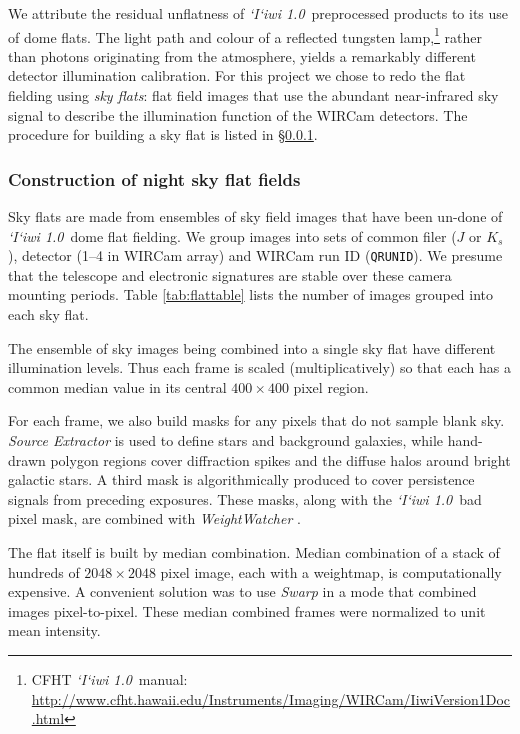 \documentclass[iop]{emulateapj}
\newcommand{\sw}[1]{\textit{#1}} %
\newcommand{\iiwione}{\sw{`I`iwi 1.0}}
\begin{document}
We attribute the residual unflatness of \iiwione\ preprocessed products to its use of dome flats.
The light path and colour of a reflected tungsten lamp,\footnote{CFHT \iiwione\ manual: \url{http://www.cfht.hawaii.edu/Instruments/Imaging/WIRCam/IiwiVersion1Doc.html}} rather than photons originating from the atmosphere, yields a remarkably different detector illumination calibration.
For this project we chose to redo the flat fielding using \emph{sky flats}: flat field images that use the abundant near-infrared sky signal to describe the illumination function of the WIRCam detectors.
The procedure for building a sky flat is listed in \S\ref{sec:skyflatpro}.

\subsubsection{Construction of night sky flat fields}
\label{sec:skyflatpro}

Sky flats are made from ensembles of sky field images that have been un-done of \iiwione\ dome flat fielding.
We group images into sets of common filer ($J$ or $K_s$), detector (1--4 in WIRCam array) and WIRCam run ID (\texttt{QRUNID}).
We presume that the telescope and electronic signatures are stable over these camera mounting periods.
Table \ref{tab:flattable} lists the number of images grouped into each sky flat.

The ensemble of sky images being combined into a single sky flat have different illumination levels. Thus each frame is scaled (multiplicatively) so that each has a common median value in its central $400\times400$ pixel region.

For each frame, we also build masks for any pixels that do not sample blank sky. \sw{Source Extractor} \citep{Bertin:1996} is used to define stars and background galaxies, while hand-drawn polygon regions cover diffraction spikes and the diffuse halos around bright galactic stars. A third mask is algorithmically produced to cover persistence signals from preceding exposures. These masks, along with the \iiwione\ bad pixel mask, are combined with \sw{WeightWatcher} \citep{Marmo:2008}.

The flat itself is built by median combination. Median combination of a stack of hundreds of $2048\times2048$ pixel image, each with a weightmap, is computationally expensive. A convenient solution was to use \sw{Swarp} \citep[an image-mosaicing software package,][]{Bertin:2002} in a mode that combined images pixel-to-pixel. These median combined frames were normalized to unit mean intensity.
\end{document}
